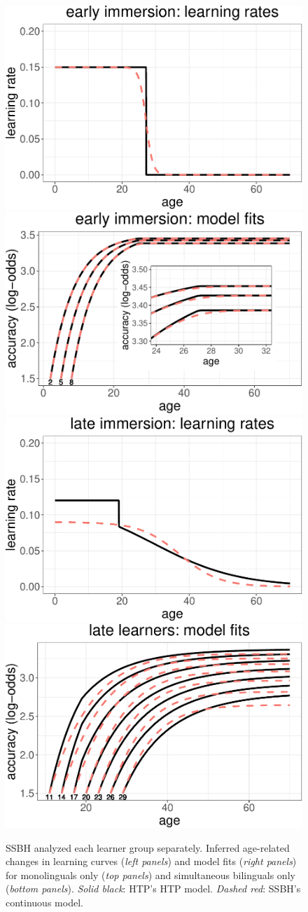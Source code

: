 \documentclass[
  english,
  doc,floatsintext]{apa6}
\begin{document}
\begin{figure}
\includegraphics[width=0.48\linewidth]{SlikResponse_rmd_files/figure-latex/immersion-1} \includegraphics[width=0.48\linewidth]{SlikResponse_rmd_files/figure-latex/immersion-2} \includegraphics[width=0.48\linewidth]{SlikResponse_rmd_files/figure-latex/immersion-3} \includegraphics[width=0.48\linewidth]{SlikResponse_rmd_files/figure-latex/immersion-4} \caption{SSBH analyzed each learner group separately. Inferred age-related changes in learning curves (\emph{left panels}) and model fits (\emph{right panels}) for monolinguals only (\emph{top panels}) and simultaneous bilinguals only (\emph{bottom panels}). \emph{Solid black}: HTP's HTP model. \emph{Dashed red}: SSBH's continuous model.}\label{fig:immersion}
\end{figure}
\end{document}
